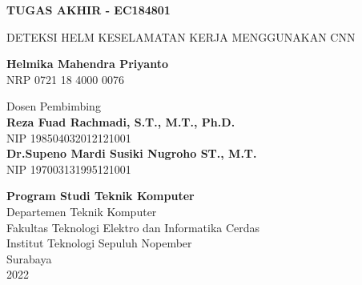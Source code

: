 \begin{flushleft}
  \fontsize{14pt}{17}
  \selectfont
  \textbf{TUGAS AKHIR - EC184801}
\end{flushleft}

\vspace{5ex}

\begin{flushleft}
  \fontsize{18pt}{22}
  \selectfont
  DETEKSI HELM KESELAMATAN KERJA MENGGUNAKAN CNN
\end{flushleft}

\vspace{6ex}

\begin{flushleft}
  \fontsize{14pt}{17}
  \selectfont
  \textbf{Helmika Mahendra Priyanto}
  \\
  NRP 0721 18 4000 0076
\end{flushleft}

\vspace{6ex}

\begin{flushleft}
  \fontsize{14pt}{17}
  \selectfont
  Dosen Pembimbing \\
  \textbf{Reza Fuad Rachmadi, S.T., M.T., Ph.D.} \\
  NIP 198504032012121001 \\
  \textbf{Dr.Supeno Mardi Susiki Nugroho ST., M.T.} \\
  NIP 197003131995121001 \\
\end{flushleft}

\vspace{6ex}

\begin{flushleft}
  \fontsize{12pt}{15}
  \selectfont
  \textbf{Program Studi Teknik Komputer}\\
  Departemen Teknik Komputer\\
  Fakultas Teknologi Elektro dan Informatika Cerdas\\
  Institut Teknologi Sepuluh Nopember\\
  Surabaya\\
  2022
\end{flushleft}
